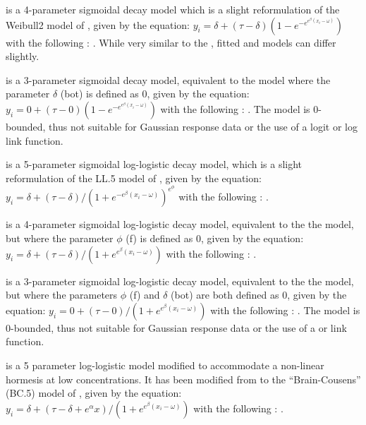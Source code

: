 \documentclass[
  shortnames]{jss}
\begin{document}
 is a 4-parameter sigmoidal decay model which is a slight reformulation of the Weibull2 model of \citet{Ritz2016}, given by the equation:
\(y_i = \delta + (\tau - \delta) (1 - e^{-e^{e^{\beta} (x_i - \omega)}})\)
with the following : . While very similar to the  \citep[according to][]{Ritz2016}, fitted  and  models can differ slightly.

 is a 3-parameter sigmoidal decay model, equivalent to the  model where the parameter \(\delta\) (bot) is defined as 0, given by the equation:
\(y_i = {0} + (\tau -{0}) (1 - e^{-e^{e^{\beta} (x_i - \omega)}})\)
with the following : . The model is 0-bounded, thus not suitable for Gaussian response data or the use of a logit or log link function.

 is a 5-parameter sigmoidal log-logistic decay model, which is a slight reformulation of the LL.5 model of \citet{Ritz2016}, given by the equation:
\(y_i = \delta + (\tau - \delta) / (1 + e^{-e^{\beta} (x_i - \omega)})^{e^\phi}\)
with the following : .

 is a 4-parameter sigmoidal log-logistic decay model, equivalent to the the  model, but where the parameter \(\phi\) (f) is defined as 0, given by the equation:
\(y_i = \delta + (\tau - \delta)/ (1 + e^{e^{\beta} (x_i - \omega)})\)
with the following : .

 is a 3-parameter sigmoidal log-logistic decay model, equivalent to the the  model, but where the parameters \(\phi\) (f) and \(\delta\) (bot) are both defined as 0, given by the equation:
\(y_i = 0 + (\tau - 0)/ (1 + e^{e^{\beta} (x_i - \omega)})\)
with the following : . The model is 0-bounded, thus not suitable for Gaussian response data or the use of a  or  link function.

 is a 5 parameter log-logistic model modified to accommodate a non-linear hormesis at low concentrations. It has been modified from to the ``Brain-Cousens'' (BC.5) model of \citet{Ritz2016}, given by the equation:
\(y_i = \delta + (\tau - \delta + e^{\alpha} x)/ (1 + e^{e^{\beta} (x_i - \omega)})\)
with the following : .
\end{document}
